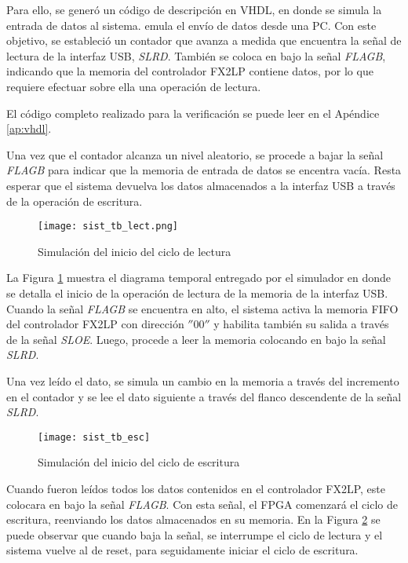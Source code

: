 	Para ello, se generó un código de descripción en VHDL, en donde se simula la entrada de datos al sistema.  emula el envío de datos desde una PC. Con este objetivo, se estableció un contador que avanza a medida que encuentra la señal de lectura de la interfaz USB, \textit{SLRD}. También se coloca en bajo la señal \textit{FLAGB}, indicando que la memoria del controlador FX2LP contiene datos, por lo que requiere efectuar sobre ella una operación de lectura.
	
	El código completo realizado para la verificación se puede leer en el Apéndice \ref{ap:vhdl}.
	
	Una vez que el contador alcanza un nivel aleatorio, se procede a bajar la señal \textit{FLAGB} para indicar que la memoria de entrada de datos se encentra vacía. Resta esperar que el sistema devuelva los datos almacenados a la interfaz USB a través de la operación de escritura.
	
	\begin{figure}[t]
		\centering
		\texttt{[image: sist\_tb\_lect.png]}
		\caption{Simulación del inicio del ciclo de lectura}
		\label{test:tb:lect}
	\end{figure}

	La Figura \ref{test:tb:lect} muestra el diagrama temporal entregado por el simulador en donde se detalla el inicio de la operación de lectura de la memoria de la interfaz USB. Cuando la señal \textit{FLAGB} se encuentra en alto, el sistema activa la memoria FIFO del controlador FX2LP con dirección $''00''$ y habilita también su salida a través de la señal \textit{SLOE}. Luego, procede a leer la memoria colocando en bajo la señal \textit{SLRD}.
	
	Una vez leído el dato, se simula un cambio en la memoria a través del incremento en el contador y se lee el dato siguiente a través del flanco descendente de la señal \textit{SLRD}.
	
	\begin{figure}[b]
		\centering
		\texttt{[image: sist\_tb\_esc]}
		\caption{Simulación del inicio del ciclo de escritura}
		\label{test:tb:escr}
	\end{figure}

	Cuando fueron leídos todos los datos contenidos en el controlador FX2LP, este colocara en bajo la señal \textit{FLAGB}. Con esta señal,
	el FPGA comenzará el ciclo de escritura, reenviando los datos almacenados en su memoria. En la Figura \ref{test:tb:escr} se puede observar que cuando baja la señal, se interrumpe el ciclo de lectura y el sistema vuelve al de reset, para seguidamente iniciar el ciclo de escritura.
	
